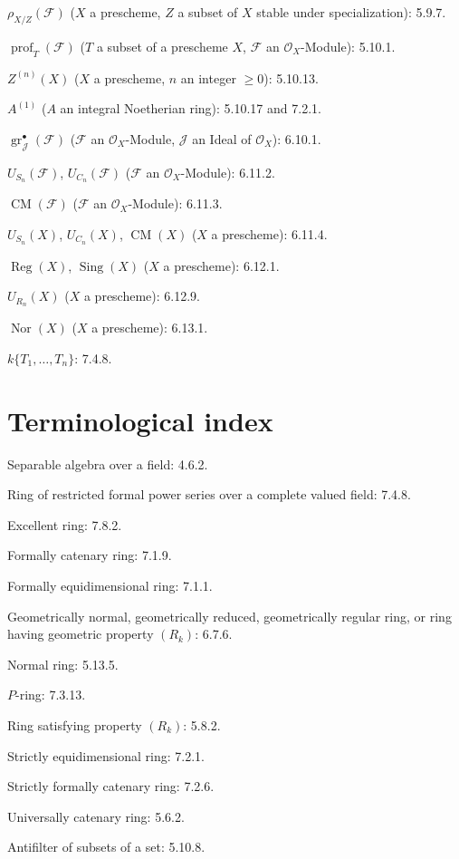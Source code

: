 $\rho_{X/Z}(\mathscr F)$ ($X$ a prescheme, $Z$ a subset of $X$ stable under
specialization): 5.9.7.

$\operatorname{prof}_T(\mathscr F)$ ($T$ a subset of a prescheme $X$,
$\mathscr F$ an $\mathcal O_X$-Module): 5.10.1.

$Z^{(n)}(X)$ ($X$ a prescheme, $n$ an integer $\geq0$): 5.10.13.

$A^{(1)}$ ($A$ an integral Noetherian ring): 5.10.17 and 7.2.1.

$\operatorname{gr}_{\mathscr J}^{\bullet}(\mathscr F)$ ($\mathscr F$ an
$\mathcal O_X$-Module, $\mathscr J$ an Ideal of $\mathcal O_X$): 6.10.1.

$U_{S_n}(\mathscr F)$, $U_{C_n}(\mathscr F)$ ($\mathscr F$ an
$\mathcal O_X$-Module): 6.11.2.

$\operatorname{CM}(\mathscr F)$ ($\mathscr F$ an $\mathcal O_X$-Module): 6.11.3.

$U_{S_n}(X)$, $U_{C_n}(X)$, $\operatorname{CM}(X)$ ($X$ a prescheme): 6.11.4.

$\operatorname{Reg}(X)$, $\operatorname{Sing}(X)$ ($X$ a prescheme): 6.12.1.

$U_{R_n}(X)$ ($X$ a prescheme): 6.12.9.

$\operatorname{Nor}(X)$ ($X$ a prescheme): 6.13.1.

$k\{T_1,\ldots,T_n\}$: 7.4.8.

\endgroup

\clearpage
{}
{}
\section*{Terminological index}

\begingroup
\footnotesize
\setlength{\parindent}{0pt}
\setlength{\parskip}{1.1pt}
\newcommand{\EGAIVtwoTermEN}[2]{#1: #2.\par}

\EGAIVtwoTermEN{Separable algebra over a field}{4.6.2}
\EGAIVtwoTermEN{Ring of restricted formal power series over a complete valued field}{7.4.8}
\EGAIVtwoTermEN{Excellent ring}{7.8.2}
\EGAIVtwoTermEN{Formally catenary ring}{7.1.9}
\EGAIVtwoTermEN{Formally equidimensional ring}{7.1.1}
\EGAIVtwoTermEN{Geometrically normal, geometrically reduced, geometrically
regular ring, or ring having geometric property $(R_k)$}{6.7.6}
\EGAIVtwoTermEN{Normal ring}{5.13.5}
\EGAIVtwoTermEN{$P$-ring}{7.3.13}
\EGAIVtwoTermEN{Ring satisfying property $(R_k)$}{5.8.2}
\EGAIVtwoTermEN{Strictly equidimensional ring}{7.2.1}
\EGAIVtwoTermEN{Strictly formally catenary ring}{7.2.6}
\EGAIVtwoTermEN{Universally catenary ring}{5.6.2}
\EGAIVtwoTermEN{Antifilter of subsets of a set}{5.10.8}

